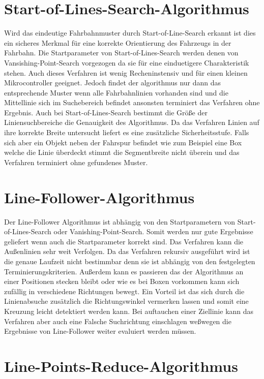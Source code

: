 \section{Start-of-Lines-Search-Algorithmus}
\label{section:Start-of-Lines-Search-Algorithmus} 
Wird das eindeutige Fahrbahnmuster durch Start-of-Line-Search erkannt ist dies ein sicheres Merkmal f{\"u}r eine korrekte Orientierung des Fahrzeugs in der Fahrbahn. Die Startparameter von Start-of-Lines-Search werden denen von Vansishing-Point-Search vorgezogen da sie f{\"u}r eine einduetigere Charakteristik stehen. Auch dieses Verfahren ist wenig Recheninstensiv und f{\"u}r einen kleinen Mikrocontroller geeignet.
Jedoch findet der algorithmus nur dann das entsprechende Muster wenn alle Fahrbahnlinien vorhanden sind und die Mittellinie sich im Suchebereich befindet ansonsten terminiert das Verfahren ohne Ergebnis.
Auch bei Start-of-Lines-Search bestimmt die Gr\"o{\ss}e der Liniensuchbereiche die Genauigkeit des Algorithmus. Da das Verfahren Linien auf ihre korrekte Breite untersucht liefert es eine zus\"atzliche Sicherheitsstufe. Falls sich aber ein Objekt neben der Fahrspur befindet wie zum Beispiel eine Box welche die Linie {\"u}berdeckt stimmt die Segmentbreite nicht {\"u}berein und das Verfahren terminiert ohne gefundenes Muster.


\section{Line-Follower-Algorithmus}
\label{section:Line-Follower-Algorithmus}
Der Line-Follower Algorithmus ist abh\"angig von den Startparametern von Start-of-Lines-Search oder Vanishing-Point-Search. Somit werden nur gute Ergebnisse geliefert wenn auch die Startparameter korrekt sind.
Das Verfahren kann die Au{\ss}enlinien sehr weit Verfolgen. Da das Verfahren rekursiv ausgef\"uhrt wird ist die genaue Laufzeit nicht bestimmbar denn sie ist abh\"angig von den festgelegten Terminierungskriterien. Au{\ss}erdem kann es passieren das der Algorithmus an einer Positionen stecken bleibt oder wie es bei Boxen vorkommen kann sich zuf\"allig in verschiedene Richtungen bewegt.
Ein Vorteil ist das sich durch die Linienabsuche zus\"atzlich die Richtungswinkel vermerken lassen und somit eine Kreuzung leicht detektiert werden kann. Bei auftauchen einer Ziellinie kann das Verfahren aber auch eine Falsche Suchrichtung einschlagen we{\ss}wegen die Ergebnisse von Line-Follower weiter evaluiert werden m\"ussen.
 

\section{Line-Points-Reduce-Algorithmus}
\label{section:Line-Points-Reduce-Algorithmus}

